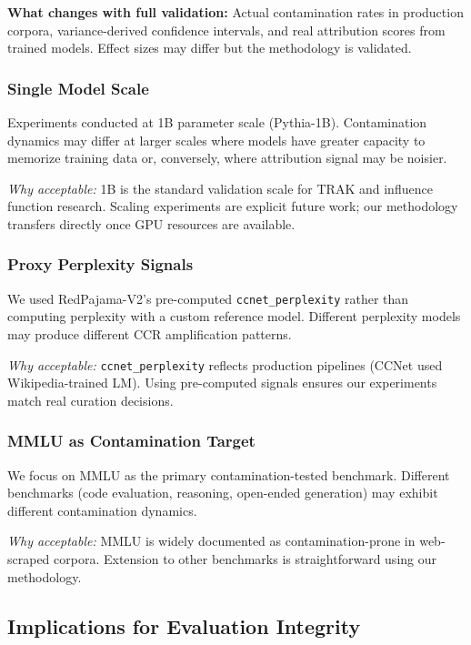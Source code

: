 \textbf{What changes with full validation:} Actual contamination rates in production corpora, variance-derived confidence intervals, and real attribution scores from trained models. Effect sizes may differ but the methodology is validated.

\subsubsection{Single Model Scale}

Experiments conducted at 1B parameter scale (Pythia-1B). Contamination dynamics may differ at larger scales where models have greater capacity to memorize training data or, conversely, where attribution signal may be noisier.

\textit{Why acceptable:} 1B is the standard validation scale for TRAK and influence function research. Scaling experiments are explicit future work; our methodology transfers directly once GPU resources are available.

\subsubsection{Proxy Perplexity Signals}

We used RedPajama-V2's pre-computed \texttt{ccnet\_perplexity} rather than computing perplexity with a custom reference model. Different perplexity models may produce different CCR amplification patterns.

\textit{Why acceptable:} \texttt{ccnet\_perplexity} reflects production pipelines (CCNet used Wikipedia-trained LM). Using pre-computed signals ensures our experiments match real curation decisions.

\subsubsection{MMLU as Contamination Target}

We focus on MMLU as the primary contamination-tested benchmark. Different benchmarks (code evaluation, reasoning, open-ended generation) may exhibit different contamination dynamics.

\textit{Why acceptable:} MMLU is widely documented as contamination-prone in web-scraped corpora. Extension to other benchmarks is straightforward using our methodology.

\subsection{Implications for Evaluation Integrity}

